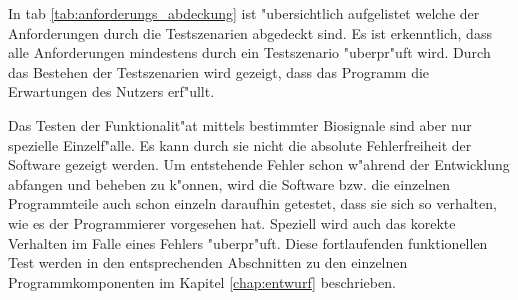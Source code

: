 In \ac{tab} \ref{tab:anforderungs_abdeckung} ist "ubersichtlich aufgelistet welche der Anforderungen durch die Testszenarien abgedeckt sind.
Es ist erkenntlich, dass alle Anforderungen mindestens durch ein Testszenario "uberpr"uft wird.
Durch das Bestehen der Testszenarien wird gezeigt, dass das Programm die Erwartungen des Nutzers erf"ullt.

Das Testen der Funktionalit"at mittels bestimmter Biosignale sind aber nur spezielle Einzelf"alle.
Es kann durch sie nicht die absolute Fehlerfreiheit der Software gezeigt werden.
Um entstehende Fehler schon w"ahrend der Entwicklung abfangen und beheben zu k"onnen, wird die Software bzw. die einzelnen Programmteile auch schon einzeln daraufhin getestet, dass sie sich so verhalten, wie es der Programmierer vorgesehen hat.
Speziell wird auch das korekte Verhalten im Falle eines Fehlers "uberpr"uft.
Diese fortlaufenden funktionellen Test werden in den entsprechenden Abschnitten zu den einzelnen Programmkomponenten im Kapitel \ref{chap:entwurf} beschrieben.

